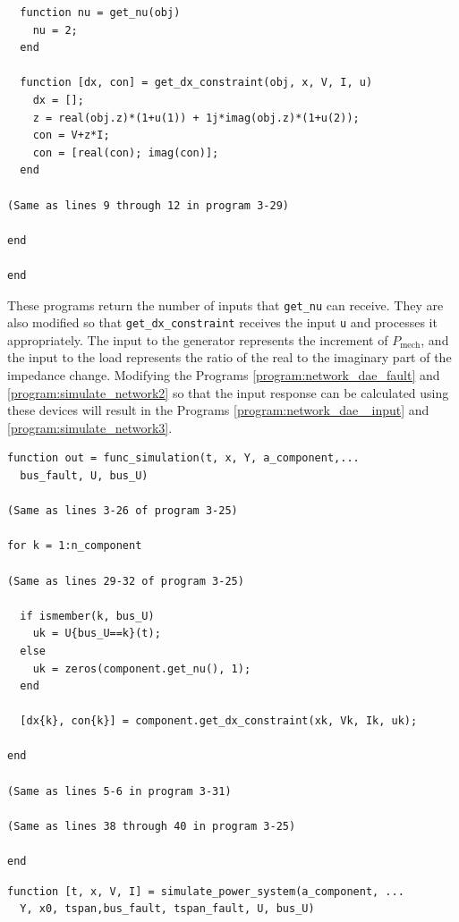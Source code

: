 \documentclass[graybox, envcountchap]{svmult}
\begin{document}
\begin{example}
\begin{PROGRAMA}[count,title={load\_impedance.m}]
\begin{verbatim}
  function nu = get_nu(obj)
    nu = 2;
  end

  function [dx, con] = get_dx_constraint(obj, x, V, I, u)
    dx = [];
    z = real(obj.z)*(1+u(1)) + 1j*imag(obj.z)*(1+u(2));
    con = V+z*I;
    con = [real(con); imag(con)];
  end

(Same as lines 9 through 12 in program 3-29)

end

end
\end{verbatim}
\end{PROGRAMA}

These programs return the number of inputs that \verb|get_nu| can receive. They are also modified so that \verb|get_dx_constraint| receives the input \verb|u| and processes it appropriately.
The input to the generator represents the increment of $P_\mathrm{mech}$, and the input to the load represents the ratio of the real to the imaginary part of the impedance change.
Modifying the Programs \ref{program:network_dae_fault} and \ref{program:simulate_network2} so that the input response can be calculated using these devices will result in the Programs \ref{program:network_dae_ input} and \ref{program:simulate_network3}.

\smallskip
\begin{PROGRAMA}[count,title={func\_simulation.m}]\label{program:network_dae_input}
\begin{verbatim}
function out = func_simulation(t, x, Y, a_component,...
  bus_fault, U, bus_U)

(Same as lines 3-26 of program 3-25)

for k = 1:n_component

(Same as lines 29-32 of program 3-25)
  
  if ismember(k, bus_U)
    uk = U{bus_U==k}(t);
  else
    uk = zeros(component.get_nu(), 1);
  end
  
  [dx{k}, con{k}] = component.get_dx_constraint(xk, Vk, Ik, uk);
  
end

(Same as lines 5-6 in program 3-31)

(Same as lines 38 through 40 in program 3-25)

end
\end{verbatim}
\end{PROGRAMA}

\begin{PROGRAMA}[count,title={simulate\_power\_system.m}]\label{program:simulate_network3}
\begin{verbatim}
function [t, x, V, I] = simulate_power_system(a_component, ...
  Y, x0, tspan,bus_fault, tspan_fault, U, bus_U)


\end{verbatim}
\end{PROGRAMA}
\end{example}
\end{document}

